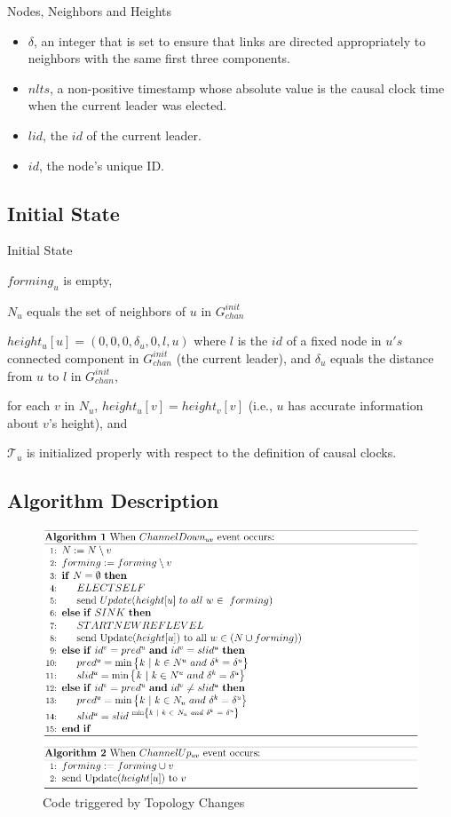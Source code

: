 \documentclass{beamer}
\begin{document}
\begin{frame}{Nodes, Neighbors and Heights}
\begin{itemize}

		\item $\delta$, an integer that is set to ensure that links are directed appropriately to neighbors with the same first three components.
	\item $nlts$, a non-positive timestamp whose absolute value is the causal clock time when the current leader was elected.
	\item $lid$, the $id$ of the current leader.
	\item $id$, the node’s unique ID.
\end{itemize}
\end{frame}
\subsection{Initial State}
\begin{frame}{Initial State}
\begin{list}{--}
	\item $forming_u$ is empty,
	\item $N_u$ equals the set of neighbors of $u$ in $G^{init} _{chan}$
	\item $height_u[u] = (0, 0, 0, \delta _u , 0, l, u)$ where $l$ is the $id$ of a fixed node in $u's$ connected component in $G^{init} _{chan}$ (the current leader), and $\delta _u$ equals the distance from $u$ to $l$ in $G^{init} _{chan}$,
	\item for each $v$ in $N_u$, $height_u[v] = height_v[v]$ (i.e., $u$ has accurate information about $v$’s height), and
	\item $\mathcal{T} _u$ is initialized properly with respect to the definition of causal clocks.
\end{list}
\end{frame}

\subsection{Algorithm Description}

\begin{frame}
\begin{figure}[h]
	\centering
	\includegraphics[width=0.8\linewidth]{channel_up_down.png}
	\caption{Code triggered by Topology Changes}
	\label{fig:figure1}
\end{figure}
\end{frame}
\end{document}
